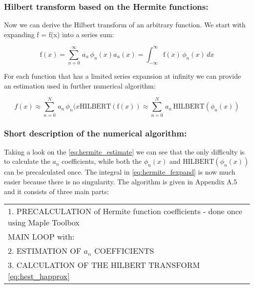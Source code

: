 \documentclass[12pt,twoside,a4paper]{article}
\numberwithin{equation}{subsection}
\numberwithin{figure}{subsection}
\begin{document}
\subsubsection*{Hilbert transform based on the Hermite functions:}

Now we can derive the Hilbert transform of an arbitrary function. We start with expanding f = f(x) into a series sum:

\begin{subequations} \label{eq:hermite_fexpand}
  \begin{equation}   \label{eq:hfe_f}
     \mathrm{f}(x)=\sum_{n=0}^{\infty }\,{a_{n}}\,{\phi_{n}}(x) 
  \end{equation}
  \begin{equation}   \label{eq:hfe_an}
     {a_{n}}(x)=\int_{ - \infty }^{\infty }\mathrm{f}(x)\,{\phi_{n}}(x)\,dx
  \end{equation}
\end{subequations}

For each function that has a limited series expansion at infinity we can provide an estimation used in further numerical algorithm:

\begin{subequations} \label{eq:hermite_estimate}
  \begin{equation}   \label{eq:hest_fapprox}
      f(x) \approx \sum_{n=0}^{N}\,{a_{n}}\,{\phi_{n}}(x
  \end{equation}
  \begin{equation}   \label{eq:hest_happrox}
     \mathrm{HILBERT}(\mathrm{f}(x)) \approx \sum_{n=0}^{N}\,{a_{n}}\,\mathrm{HILBERT}({\phi_{n}}(x))
  \end{equation}
\end{subequations}

\subsubsection*{Short description of the numerical algorithm:}

Taking a look on the \ref{eq:hermite_estimate} we can see that the only difficulty is to calculate the ${a_{n}}$ coefficients,
while both the ${\phi_{n}}(x)$ and $\mathrm{HILBERT}({\phi_{n}}(x))$ can be precalculated once. The integral in
\ref{eq:hermite_fexpand} is now much easier because there is no singularity. The algorithm is given in Appendix A.5 and it
consists of three main parts:


\begin{tabular}{l}
  1. PRECALCULATION of Hermite function coefficients - done once using Maple Toolbox \\
  MAIN LOOP with: \\
  2. ESTIMATION OF ${a_{n}}$ COEFFICIENTS \\
  3. CALCULATION OF THE HILBERT TRANSFORM \ref{eq:hest_happrox} \\
\end{tabular}
\end{document}
